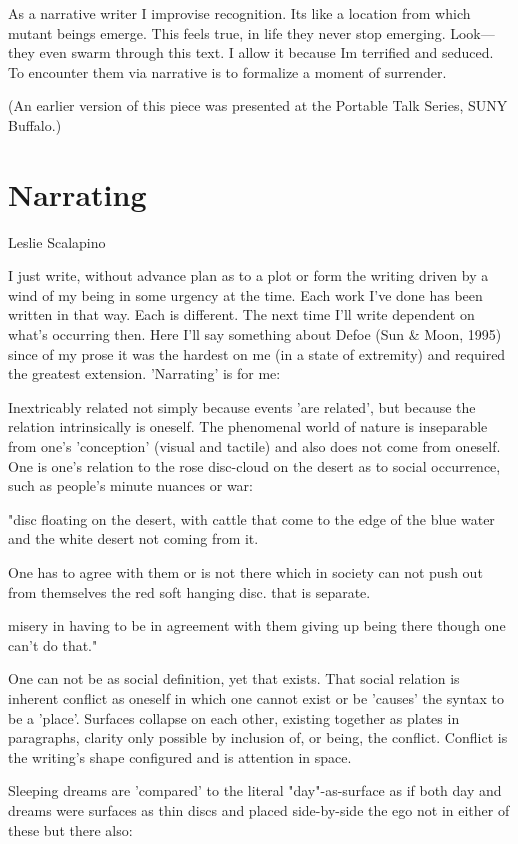As a narrative writer I improvise recognition. Its like a location from
which mutant beings emerge. This feels true, in life they never stop
emerging. Look---they even swarm through this text. I allow it because
Im terrified and seduced. To encounter them via narrative is to
formalize a moment of surrender.

(An earlier version of this piece was presented at the Portable Talk
Series, SUNY Buffalo.)

\hypertarget{narrating}{%
\section{Narrating}\label{narrating}}

Leslie Scalapino

I just write, without advance plan as to a plot or form the writing
driven by a wind of my being in some urgency at the time. Each work I've
done has been written in that way. Each is different. The next time I'll
write dependent on what's occurring then. Here I'll say something about
Defoe (Sun \& Moon, 1995) since of my prose it was the hardest on me (in
a state of extremity) and required the greatest extension. 'Narrating'
is for me:

Inextricably related not simply because events 'are related', but
because the relation intrinsically is oneself. The phenomenal world of
nature is inseparable from one's 'conception' (visual and tactile) and
also does not come from oneself. One is one's relation to the rose
disc-cloud on the desert as to social occurrence, such as people's
minute nuances or war:

"disc floating on the desert, with cattle that come to the edge of the
blue water and the white desert not coming from it.

One has to agree with them or is not there which in society can not push
out from themselves the red soft hanging disc. that is separate.

misery in having to be in agreement with them giving up being there
though one can't do that."

One can not be as social definition, yet that exists. That social
relation is inherent conflict as oneself in which one cannot exist or be
'causes' the syntax to be a 'place'. Surfaces collapse on each other,
existing together as plates in paragraphs, clarity only possible by
inclusion of, or being, the conflict. Conflict is the writing's shape
configured and is attention in space.

Sleeping dreams are 'compared' to the literal "day"-as-surface as if
both day and dreams were surfaces as thin discs and placed side-by-side
the ego not in either of these but there also:

